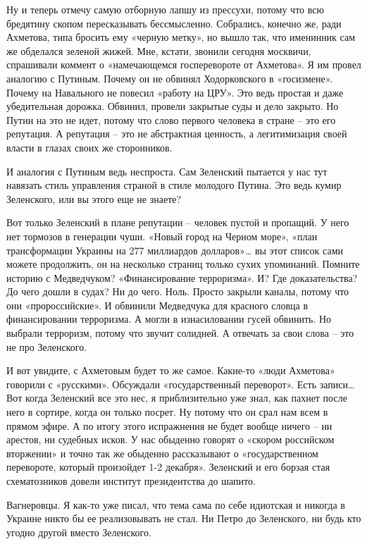 Ну и теперь отмечу самую отборную лапшу из прессухи, потому что всю бредятину
скопом пересказывать бессмысленно. Собрались, конечно же, ради Ахметова, типа
бросить ему «черную метку», но вышло так, что именинник сам же обделался
зеленой жижей. Мне, кстати, звонили сегодня москвичи, спрашивали коммент о
«намечающемся госперевороте от Ахметова». Я им провел аналогию с Путиным.
Почему он не обвинял Ходорковского в «госизмене». Почему на Навального не
повесил «работу на ЦРУ». Это ведь простая и даже убедительная дорожка. Обвинил,
провели закрытые суды и дело закрыто. Но Путин на это не идет, потому что слово
первого человека в стране – это его репутация. А репутация – это не абстрактная
ценность, а легитимизация своей власти в глазах своих же сторонников.

И аналогия с Путиным ведь неспроста. Сам Зеленский пытается у нас тут навязать
стиль управления страной в стиле молодого Путина. Это ведь кумир Зеленского,
или вы этого еще не знаете?

Вот только Зеленский в плане репутации – человек пустой и пропащий. У него нет
тормозов в генерации чуши. «Новый город на Черном море», «план трансформации
Украины на 277 миллиардов долларов»… вы этот список сами можете продолжить, он
на несколько страниц только сухих упоминаний. Помните историю с Медведчуком?
«Финансирование терроризма». И? Где доказательства? До чего дошли в судах? Ни
до чего. Ноль. Просто закрыли каналы, потому что они «пророссийские». И
обвинили Медведчука для красного словца в финансировании терроризма. А могли в
изнасиловании гусей обвинить. Но выбрали терроризм, потому что звучит солидней.
А отвечать за свои слова – это не про Зеленского.

И вот увидите, с Ахметовым будет то же самое. Какие-то «люди Ахметова» говорили
с «русскими». Обсуждали «государственный переворот». Есть записи… Вот когда
Зеленский все это нес, я приблизительно уже знал, как пахнет после него в
сортире, когда он только посрет. Ну потому что он срал нам всем в прямом эфире.
А по итогу этого испражнения не будет вообще ничего – ни арестов, ни судебных
исков. У нас обыденно говорят о «скором российском вторжении» и точно так же
обыденно рассказывают о «государственном перевороте, который произойдет 1-2
декабря». Зеленский и его борзая стая схематозников довели институт
президентства до шапито.

Вагнеровцы. Я как-то уже писал, что тема сама по себе идиотская и никогда в
Украине никто бы ее реализовывать не стал. Ни Петро до Зеленского, ни будь кто
угодно другой вместо Зеленского.

